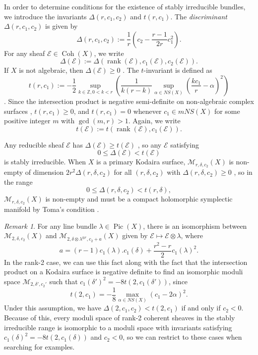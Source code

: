 \documentclass{article}[12pt]
\theoremstyle{definition}
\theoremstyle{remark}
\newtheorem{remark}[theorem]{Remark}
\newcommand \Z{\mathbb Z}
\numberwithin{equation}{section}
\newcommand \mc{\mathcal}
\DeclareMathOperator{\Pic}{Pic}
\DeclareMathOperator{\rank}{rank}
\DeclareMathOperator{\Coh}{Coh}
\begin{document}
In order to determine conditions for the existence of stably irreducible bundles, we introduce the invariants $\Delta(r,c_1,c_2)$ and $t(r,c_1)$. The \emph{discriminant} $\Delta(r,c_1,c_2)$ is given by $$\Delta(r,c_1,c_2):=\frac{1}{r}\left(c_2-\frac{r-1}{2r}c_1^2\right).$$
For any sheaf $\mc{E}\in \Coh(X)$, we write $$\Delta(\mc{E}):=\Delta(\rank(\mc{E}), c_1(\mc{E}), c_2(\mc{E})).$$ If $X$ is not algebraic, then $\Delta(\mc{E})\geq 0$ \cite[Theorem 4.17]{Brin}. The $t$-invariant is defined as $$t(r,c_1):=-\frac{1}{2}\sup_{k\in \Z, 0<k<r} \left(\frac{1}{k(r-k)}\sup_{\alpha \in NS(X)}\left(\frac{kc_1}{r}-\alpha\right)^2\right)$$ \cite[Lemma 4.30]{Brin}. Since the intersection product is negative semi-definite on non-algebraic complex surfaces \cite[Corollary 2.9]{Brin}, $t(r,c_1)\geq 0$, and $t(r,c_1)=0$ whenever $c_1 \in m NS(X)$ for some positive integer $m$ with $\gcd(m,r)>1$. Again, we write $$t(\mc{E}):=t(\rank(\mc{E}), c_1(\mc{E})).$$


Any reducible sheaf $\mc{E}$ has $\Delta(\mc{E})\geq t(\mc{E})$ \cite[Lemma 4.30]{Brin}, so any $\mc{E}$ satisfying $$0\leq \Delta(\mc{E})<t(\mc{E})$$ is stably irreducible. When $X$ is a primary Kodaira surface, $\mc{M}_{r,\delta,c_2}(X)$ is non-empty of dimension $2r^2\Delta(r,\delta,c_2)$ for all $(r,\delta,c_2)$ with $\Delta(r,\delta,c_2)\geq 0$ \cite{TomaNote}, so in the range $$0\leq \Delta(r,\delta,c_2)<t(r,\delta),$$ $\mc{M}_{r,\delta,c_2}(X)$ is non-empty and must be a compact holomorphic symplectic manifold by Toma's condition \cite{TomaCpt}.

\begin{remark}\label{tensor}
	For any line bundle $\lambda \in \Pic(X)$, there is an isomorphism between $\mc{M}_{2, \delta, c_2}(X)$ and $\mc{M}_{2, \delta\otimes \lambda^{\otimes r}, c_2+a}(X)$ given by $\mc{E} \mapsto \mc{E}\otimes \lambda$,
	where $$a=(r-1)c_1(\lambda).c_1(\delta)+\frac{r^2-r}{2}c_1(\lambda)^2.$$ In the rank-2 case, we can use this fact along with the fact that the intersection product on a Kodaira surface is negative definite to find an isomorphic moduli space $\mc{M}_{2,\delta',c_2'}$ such that $c_1(\delta')^2=-8t(2,c_1(\delta'))$, since $$t(2,c_1)=-\frac{1}{8}\max\limits_{\alpha \in NS(X)}(c_1-2\alpha)^2.$$ Under this assumption, we have  $\Delta(2,c_1,c_2)<t(2,c_1)$ if and only if $c_2<0$. Because of this, every moduli space of rank-2 coherent sheaves in the stably irreducible range is isomorphic to a moduli space with invariants satisfying $c_1(\delta)^2=-8t(2,c_1(\delta))$ and $c_2<0$, so we can restrict to these cases when searching for examples.
\end{remark}
\end{document}
